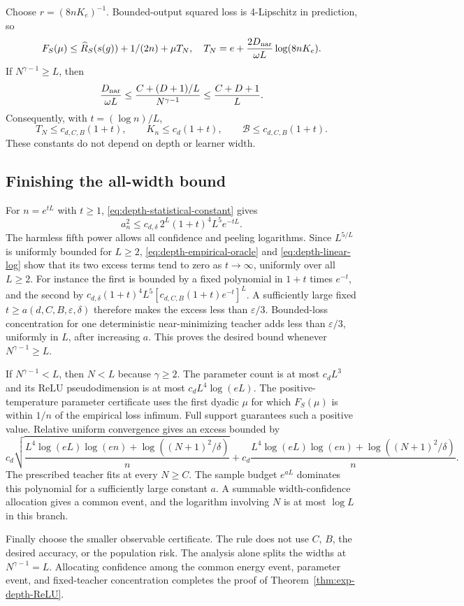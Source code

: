 Choose $r=(8nK_e)^{-1}$. Bounded-output squared loss is 4-Lipschitz in prediction, so
\begin{equation}
 F_S(\mu)\le\widehat R_S(s(g))+1/(2n)+\mu T_N,
 \quad
 T_N=e+\frac{2D_{\rm nar}}{\omega L}\log(8nK_e).
 \label{eq:depth-teacher-cost}
\end{equation}
If $N^{\gamma-1}\ge L$, then
\[
 \frac{D_{\rm nar}}{\omega L}
 \le\frac{C+(D+1)/L}{N^{\gamma-1}}
 \le\frac{C+D+1}{L}.
\]
Consequently, with $t=(\log n)/L$,
\begin{equation}
 T_N\le c_{d,C,B}(1+t),\qquad
 K_n\le c_d(1+t),\qquad
 \mathcal B\le c_{d,C,B}(1+t).
 \label{eq:depth-linear-log}
\end{equation}
These constants do not depend on depth or learner width.

\subsection{Finishing the all-width bound}
For $n=e^{tL}$ with $t\ge1$, \eqref{eq:depth-statistical-constant} gives
\[
 a_n^2\le c_{d,\delta}\,2^L(1+t)^4L^5e^{-tL}.
\]
The harmless fifth power allows all confidence and peeling logarithms. Since $L^{5/L}$ is uniformly bounded for $L\ge2$, \eqref{eq:depth-empirical-oracle} and \eqref{eq:depth-linear-log} show that its two excess terms tend to zero as $t\to\infty$, uniformly over all $L\ge2$. For instance the first is bounded by a fixed polynomial in $1+t$ times $e^{-t}$, and the second by
$c_{d,\delta}(1+t)^4L^5[c_{d,C,B}(1+t)e^{-t}]^L$.
A sufficiently large fixed $t\ge a(d,C,B,\varepsilon,\delta)$ therefore makes the excess less than $\varepsilon/3$. Bounded-loss concentration for one deterministic near-minimizing teacher adds less than $\varepsilon/3$, uniformly in $L$, after increasing $a$. This proves the desired bound whenever $N^{\gamma-1}\ge L$.

If $N^{\gamma-1}<L$, then $N<L$ because $\gamma\ge2$. The parameter count is at most $c_dL^3$ and its ReLU pseudodimension is at most $c_dL^4\log(eL)$. The positive-temperature parameter certificate uses the first dyadic $\mu$ for which $F_S(\mu)$ is within $1/n$ of the empirical loss infimum. Full support guarantees such a positive value. Relative uniform convergence gives an excess bounded by
\[
 c_d\sqrt{\frac{L^4\log(eL)\log(en)+\log((N+1)^2/\delta)}n}
 +c_d\frac{L^4\log(eL)\log(en)+\log((N+1)^2/\delta)}n.
\]
The prescribed teacher fits at every $N\ge C$. The sample budget $e^{aL}$ dominates this polynomial for a sufficiently large constant $a$. A summable width-confidence allocation gives a common event, and the logarithm involving $N$ is at most $\log L$ in this branch.

Finally choose the smaller observable certificate. The rule does not use $C$, $B$, the desired accuracy, or the population risk. The analysis alone splits the widths at $N^{\gamma-1}=L$. Allocating confidence among the common energy event, parameter event, and fixed-teacher concentration completes the proof of Theorem~\ref{thm:exp-depth-ReLU}.
